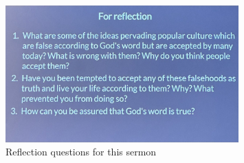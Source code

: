 \begin{itemize}
{\begin{figure}[H]
    \includegraphics[width=0.8\textwidth, trim={0cm 0cm 0cm 0cm},clip]{Figures/aprilSermon4Reflections.jpg}
    \caption[]{Reflection questions for this sermon}
  \end{figure}}
\end{itemize}